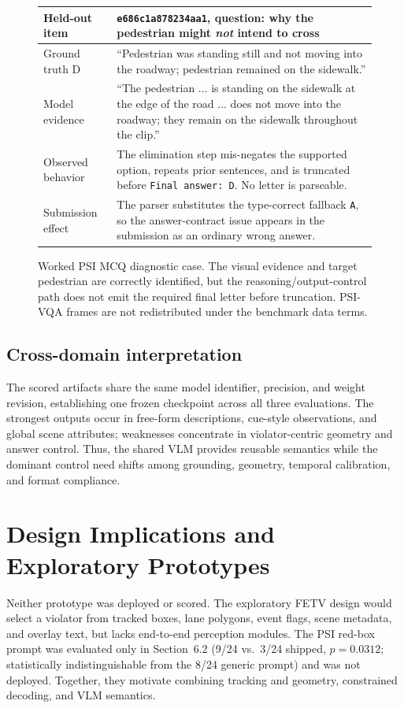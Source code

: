 \documentclass[runningheads]{llncs}
\begin{document}
\begin{figure}[t]
\centering
\footnotesize
\setlength{\fboxsep}{5pt}
\begin{tabularx}{\textwidth}{@{}L{0.20\textwidth}Y@{}}
\toprule
Held-out item & \texttt{e686c1a878234aa1}, question: why the pedestrian might \emph{not} intend to cross \\
\midrule
Ground truth D & ``Pedestrian was standing still and not moving into the roadway; pedestrian remained on the sidewalk.'' \\
\midrule
Model evidence & ``The pedestrian ... is standing on the sidewalk at the edge of the road ... does not move into the roadway; they remain on the sidewalk throughout the clip.'' \\
\midrule
Observed behavior & The elimination step mis-negates the supported option, repeats prior sentences, and is truncated before \texttt{Final answer: D}. No letter is parseable. \\
\midrule
Submission effect & The parser substitutes the type-correct fallback \texttt{A}, so the answer-contract issue appears in the submission as an ordinary wrong answer. \\
\bottomrule
\end{tabularx}
\caption{Worked PSI MCQ diagnostic case. The visual evidence and target pedestrian are correctly identified, but the reasoning/output-control path does not emit the required final letter before truncation. PSI-VQA frames are not redistributed under the benchmark data terms.}
\label{fig:case}
\end{figure}

\subsection{Cross-domain interpretation}
The scored artifacts share the same model identifier, precision, and weight revision, establishing one frozen checkpoint across all three evaluations. The strongest outputs occur in free-form descriptions, cue-style observations, and global scene attributes; weaknesses concentrate in violator-centric geometry and answer control. Thus, the shared VLM provides reusable semantics while the dominant control need shifts among grounding, geometry, temporal calibration, and format compliance.

\section{Design Implications and Exploratory Prototypes}
Neither prototype was deployed or scored. The exploratory FETV design would select a violator from tracked boxes, lane polygons, event flags, scene metadata, and overlay text, but lacks end-to-end perception modules. The PSI red-box prompt was evaluated only in Section~6.2 (9/24 vs.\ 3/24 shipped, $p=0.0312$; statistically indistinguishable from the 8/24 generic prompt) and was not deployed. Together, they motivate combining tracking and geometry, constrained decoding, and VLM semantics.
\end{document}
